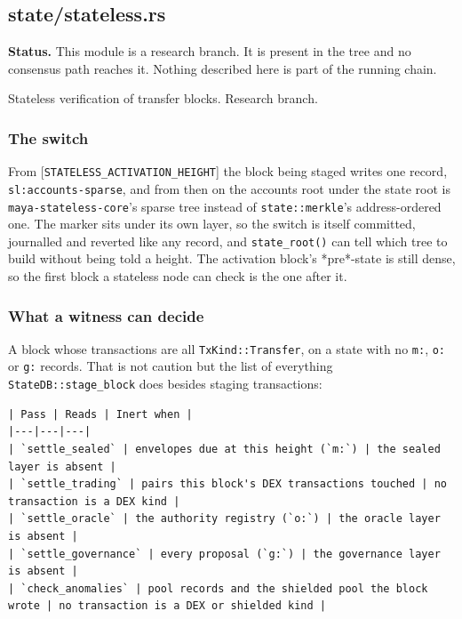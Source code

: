 \documentclass[11pt,a4paper]{article}
\begin{document}
\subsection{state/stateless.rs}
\begin{framed}\noindent\textbf{Status.} This module is a research branch. It is present in the tree and no consensus path reaches it. Nothing described here is part of the running chain.\end{framed}

Stateless verification of transfer blocks. Research branch.

\subsubsection{The switch}

From [\texttt{STATELESS\_ACTIVATION\_HEIGHT}] the block being staged writes one
record, \texttt{sl:accounts-sparse}, and from then on the accounts root under the
state root is \texttt{maya-stateless-core}'s sparse tree instead of
\texttt{state::merkle}'s address-ordered one. The marker sits under its own layer,
so the switch is itself committed, journalled and reverted like any record,
and \texttt{state\_root()} can tell which tree to build without being told a
height. The activation block's *pre*-state is still dense, so the first
block a stateless node can check is the one after it.

\subsubsection{What a witness can decide}

A block whose transactions are all \texttt{TxKind::Transfer}, on a state with no
\texttt{m:}, \texttt{o:} or \texttt{g:} records. That is not caution but the list of everything
\texttt{StateDB::stage\_block} does besides staging transactions:

\begin{verbatim}
| Pass | Reads | Inert when |
|---|---|---|
| `settle_sealed` | envelopes due at this height (`m:`) | the sealed layer is absent |
| `settle_trading` | pairs this block's DEX transactions touched | no transaction is a DEX kind |
| `settle_oracle` | the authority registry (`o:`) | the oracle layer is absent |
| `settle_governance` | every proposal (`g:`) | the governance layer is absent |
| `check_anomalies` | pool records and the shielded pool the block wrote | no transaction is a DEX or shielded kind |
\end{verbatim}
\end{document}
